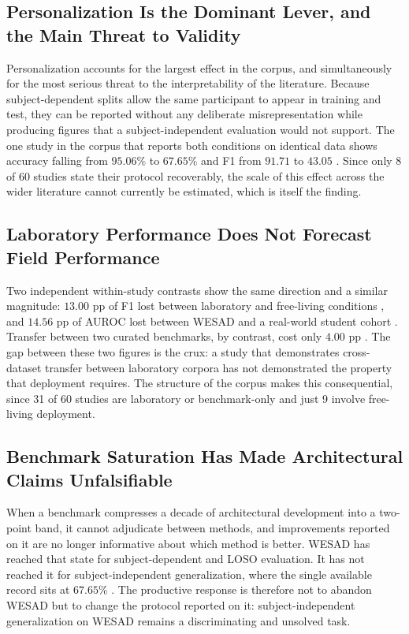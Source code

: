 \subsection{Personalization Is the Dominant Lever, and the Main Threat to Validity}
Personalization accounts for the largest effect in the corpus, and simultaneously for the
most serious threat to the interpretability of the literature. Because subject-dependent
splits allow the same participant to appear in training and test, they can be reported
without any deliberate misrepresentation while producing figures that a subject-independent
evaluation would not support. The one study in the corpus that reports both conditions on
identical data shows accuracy falling from $95.06\%$ to $67.65\%$ and F1 from $91.71$ to
$43.05$ \cite{r33}. Since only 8 of 60 studies state their protocol recoverably, the scale of
this effect across the wider literature cannot currently be estimated, which is itself the
finding.

\subsection{Laboratory Performance Does Not Forecast Field Performance}
Two independent within-study contrasts show the same direction and a similar magnitude:
$13.00$ pp of F1 lost between laboratory and free-living conditions \cite{r13}, and
$14.56$ pp of AUROC lost between WESAD and a real-world student cohort \cite{r49}. Transfer
between two curated benchmarks, by contrast, cost only $4.00$ pp \cite{r55,r61}. The gap
between these two figures is the crux: a study that demonstrates cross-dataset transfer
between laboratory corpora has not demonstrated the property that deployment requires. The
structure of the corpus makes this consequential, since 31 of 60 studies are laboratory or
benchmark-only and just 9 involve free-living deployment.

\subsection{Benchmark Saturation Has Made Architectural Claims Unfalsifiable}
When a benchmark compresses a decade of architectural development into a two-point band, it
cannot adjudicate between methods, and improvements reported on it are no longer informative
about which method is better. WESAD has reached that state for subject-dependent and LOSO
evaluation. It has not reached it for subject-independent generalization, where the single
available record sits at $67.65\%$ \cite{r33}. The productive response is therefore not to
abandon WESAD but to change the protocol reported on it: subject-independent generalization
on WESAD remains a discriminating and unsolved task.

